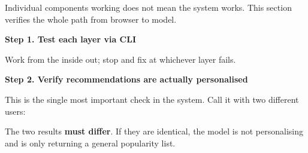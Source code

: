 Individual components working does not mean the system works. This
section verifies the whole path from browser to model.

\vspace{0.5em}\noindent\textbf{Step 1. Test each layer via
CLI}\par

Work from the inside out; stop and fix at whichever layer fails.

\begin{Shaded}
\begin{Highlighting}[]


\DataTypeTok{\textbackslash{}}
   \OperatorTok{\textless{}}\OperatorTok{\textgreater{}}

 
\end{Highlighting}
\end{Shaded}

\vspace{0.5em}\noindent\textbf{Step 2. Verify recommendations are actually
personalised}\par

This is the single most important check in the system. Call it with two
different users:

\begin{Shaded}
\begin{Highlighting}[]
 
 
\end{Highlighting}
\end{Shaded}

The two results \textbf{must differ}. If they are identical, the model
is not personalising and is only returning a general popularity list.

